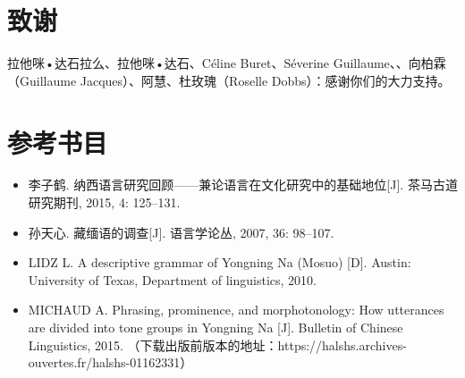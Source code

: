 \documentclass[oldfontcommands,oneside,a4paper,11pt]{article}
\newcommand{\zh}[1]{{\cn #1}}
\begin{document}
	\section{ \zh{致谢}} \label{sec:thks}
	
	\zh{拉他咪•达石拉么、拉他咪•达石、}Céline Buret\zh{、}Séverine Guillaume\zh{、、向柏霖}（Guillaume Jacques）\zh{、阿慧、杜玫瑰}（Roselle Dobbs）\zh{：感谢你们的大力支持。}
	
	
	\section{\zh{参考书目}} \label{sec:refs}
	\begin{itemize}
		\item \zh{李子鹤. 纳西语言研究回顾——兼论语言在文化研究中的基础地位[J]. 茶马古道研究期刊, 2015, 4: 125–131.}
		\item \zh{孙天心. 藏缅语的调查[J]. 语言学论丛, 2007, 36: 98–107.}
		\item LIDZ L. A descriptive grammar of Yongning Na (Mosuo) [D]. Austin: University of Texas, Department of linguistics, 2010.
		\item MICHAUD A. Phrasing, prominence, and morphotonology: How utterances are divided into tone groups in Yongning Na [J]. Bulletin of Chinese Linguistics, 2015. \zh{（下载出版前版本的地址：}https://halshs.archives-ouvertes.fr/halshs-01162331\zh{）}
	\end{itemize}
	
	
	
	
	
	
\end{document}
